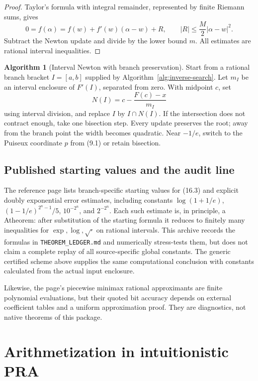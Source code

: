 \documentclass[11pt]{article}
\theoremstyle{definition}
\newtheorem{algorithm}[theorem]{Algorithm}
\newcommand{\abs}[1]{\left|#1\right|}
\newcommand{\code}[1]{\nolinkurl{#1}}
\newcommand{\StatusA}{\textsf{A}}
\begin{document}
\begin{proof}
Taylor's formula with integral remainder, represented by finite Riemann sums,
gives
\[
 0=f(\alpha)=f(w)+f'(w)(\alpha-w)+R,
 \qquad \abs R\le\frac M2\abs{\alpha-w}^2.
\]
Subtract the Newton update and divide by the lower bound \(m\).  All estimates
are rational interval inequalities.
\end{proof}

\begin{algorithm}[Interval Newton with branch preservation]\label{alg:interval-newton}
Start from a rational branch bracket \(I=[a,b]\) supplied by
Algorithm~\ref{alg:inverse-search}.  Let \(m_I\) be an interval enclosure of
\(F'(I)\), separated from zero.  With midpoint \(c\), set
\[
 N(I)=c-\frac{F(c)-x}{m_I}
\]
using interval division, and replace \(I\) by \(I\cap N(I)\).  If the
intersection does not contract enough, take one bisection step.  Every update
preserves the root; away from the branch point the width becomes quadratic.
Near \(-1/e\), switch to the Puiseux coordinate \(p\) from (9.1) or retain
bisection.
\end{algorithm}

\subsection{Published starting values and the audit line}

The reference page lists branch-specific starting values for (16.3) and
explicit doubly exponential error estimates, including constants
\(\log(1+1/e)\), \((1-1/e)^{2^n-1}/5\), \(10^{-2^n}\), and
\(2^{-2^n}\).  Each such estimate is, in principle, a \StatusA theorem: after
substitution of the starting formula it reduces to finitely many inequalities
for \(\exp,\log,\sqrt{\cdot}\) on rational intervals.  This archive records the
formulas in \code{THEOREM_LEDGER.md} and numerically stress-tests them, but does
not claim a complete replay of all source-specific global constants.  The
generic certified scheme above supplies the same computational conclusion with
constants calculated from the actual input enclosure.

Likewise, the page's piecewise minimax rational approximants are finite
polynomial evaluations, but their quoted bit accuracy depends on external
coefficient tables and a uniform approximation proof.  They are diagnostics,
not native theorems of this package.

\section{Arithmetization in intuitionistic PRA}\label{sec:arithmetization}
\end{document}
